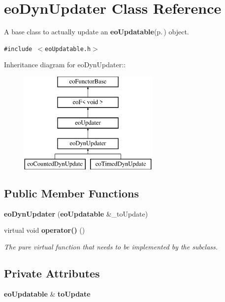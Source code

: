 \section{eo\-Dyn\-Updater Class Reference}
\label{classeo_dyn_updater}
A base class to actually update an {\bf eo\-Updatable}{\rm (p.\,\pageref{classeo_updatable})} object.  


{\tt \#include $<$eo\-Updatable.h$>$}

Inheritance diagram for eo\-Dyn\-Updater::\begin{figure}[H]
\begin{center}
\leavevmode
\includegraphics[height=5cm]{classeo_dyn_updater}
\end{center}
\end{figure}
\subsection*{Public Member Functions}
\begin{CompactItemize}
\item 
{\bf eo\-Dyn\-Updater} ({\bf eo\-Updatable} \&\_\-to\-Update)\label{classeo_dyn_updater_a0}

\item 
virtual void {\bf operator()} ()\label{classeo_dyn_updater_a1}

\begin{CompactList}\small\item\em The pure virtual function that needs to be implemented by the subclass. \item\end{CompactList}\end{CompactItemize}
\subsection*{Private Attributes}
\begin{CompactItemize}
\item 
{\bf eo\-Updatable} \& {\bf to\-Update}\label{classeo_dyn_updater_r0}

\end{CompactItemize}


